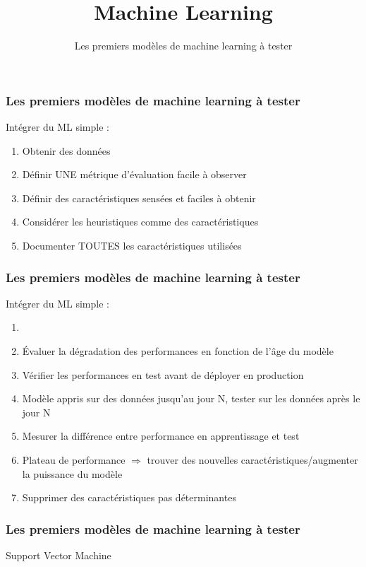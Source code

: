 \documentclass{formation}
\title{Machine Learning}
\subtitle{Les premiers modèles de machine learning à tester}
\begin{document}
\maketitle

\begin{frame}
  \frametitle{Les premiers modèles de machine learning à tester}
  Intégrer du ML simple :
  \begin{enumerate}
  \item Obtenir des données
  \item Définir UNE métrique d'évaluation facile à observer
  \item Définir des caractéristiques sensées et faciles à obtenir
  \item Considérer les heuristiques comme des caractéristiques
  \item Documenter TOUTES les caractéristiques utilisées
  \end{enumerate}
\end{frame}

\begin{frame}
  \frametitle{Les premiers modèles de machine learning à tester}
  Intégrer du ML simple :
  \begin{enumerate}\addtocounter{enumi}{5}
  \item {}
  \item Évaluer la dégradation des performances en fonction de l'âge du modèle
  \item Vérifier les performances en test avant de déployer en production
  \item Modèle appris sur des données jusqu'au jour N, tester sur les données après le jour N
  \item Mesurer la différence entre performance en apprentissage et test
  \item Plateau de performance $\Rightarrow$ trouver des nouvelles caractéristiques/augmenter la puissance du modèle
  \item Supprimer des caractéristiques pas déterminantes
  \end{enumerate}
\end{frame}

\begin{frame}
  \frametitle{Les premiers modèles de machine learning à tester}
  \begin{minipage}[l]{0.49\linewidth}
    \begin{center}
      Support Vector Machine
    \end{center}
  \end{minipage}\hfill
  \begin{minipage}[l]{0.49\linewidth}
  \end{minipage}\hfill
\end{frame}
\end{document}
